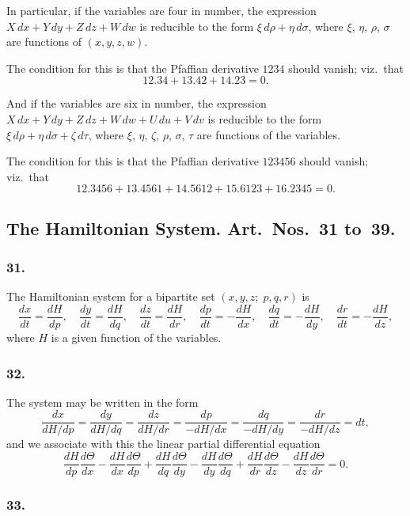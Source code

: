 \documentclass[12pt,a4paper]{article}
\theoremstyle{plain}
\begin{document}
In particular, if the variables are four in number, the expression $X\,dx + Y\,dy + Z\,dz + W\,dw$ is reducible to the form $\xi\,d\rho + \eta\,d\sigma$, where $\xi$, $\eta$, $\rho$, $\sigma$ are functions of $(x, y, z, w)$.

The condition for this is that the Pfaffian derivative $1234$ should vanish; viz.~that
\[
12.34 + 13.42 + 14.23 = 0.
\]

And if the variables are six in number, the expression $X\,dx + Y\,dy + Z\,dz + W\,dw + U\,du + V\,dv$ is reducible to the form $\xi\,d\rho + \eta\,d\sigma + \zeta\,d\tau$, where $\xi$, $\eta$, $\zeta$, $\rho$, $\sigma$, $\tau$ are functions of the variables.

The condition for this is that the Pfaffian derivative $123456$ should vanish; viz.~that
\[
12.3456 + 13.4561 + 14.5612 + 15.6123 + 16.2345 = 0.
\]

\subsection*{The Hamiltonian System. Art.~Nos.~31 to~39.}

\subsubsection*{31.}

The Hamiltonian system for a bipartite set $(x, y, z;\; p, q, r)$ is
\[
\frac{dx}{dt} = \frac{dH}{dp}, \quad \frac{dy}{dt} = \frac{dH}{dq}, \quad \frac{dz}{dt} = \frac{dH}{dr}, \quad
\frac{dp}{dt} = -\frac{dH}{dx}, \quad \frac{dq}{dt} = -\frac{dH}{dy}, \quad \frac{dr}{dt} = -\frac{dH}{dz},
\]
where $H$ is a given function of the variables.

\subsubsection*{32.}

The system may be written in the form
\[
\frac{dx}{dH/dp} = \frac{dy}{dH/dq} = \frac{dz}{dH/dr} = \frac{dp}{-dH/dx} = \frac{dq}{-dH/dy} = \frac{dr}{-dH/dz} = dt,
\]
and we associate with this the linear partial differential equation
\[
\frac{dH}{dp}\frac{d\Theta}{dx} - \frac{dH}{dx}\frac{d\Theta}{dp} + \frac{dH}{dq}\frac{d\Theta}{dy} - \frac{dH}{dy}\frac{d\Theta}{dq} + \frac{dH}{dr}\frac{d\Theta}{dz} - \frac{dH}{dz}\frac{d\Theta}{dr} = 0.
\]

\newpage
\setcounter{page}{126}

\subsubsection*{33.}
\end{document}
